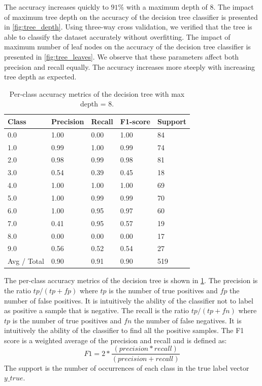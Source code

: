 The accuracy increases quickly to $91\%$ with a maximum depth of $8$. The impact
of maximum tree depth on the accuracy of the decision tree classifier
is presented in \cref{fig:tree_depth}. Using three-way cross validation,
we verified that the tree is able to classify the dataset accurately 
without overfitting. 
The impact of maximum number of leaf nodes on the accuracy of the 
decision tree classifier is presented in \cref{fig:tree_leaves}.
We observe that these parameters affect both precision and recall
equally. The accuracy increases more steeply with increasing tree
depth as expected.

\begin{table}[h!]
  \centering
  \begin{tabular}{l|llll} 
	\toprule
   		Class &  Precision  &  Recall &  F1-score  &  Support  \\    
    \midrule
		0.0   &    1.00   &   0.00   &   1.00   &     84   \\
        1.0   &    0.99   &   1.00   &   0.99   &     74   \\
        2.0   &    0.98   &   0.99   &   0.98   &     81   \\
        3.0   &    0.54   &   0.39   &   0.45   &     18   \\
        4.0   &    1.00   &   1.00   &   1.00   &     69   \\
        5.0   &    1.00   &   0.99   &   0.99   &     70   \\
        6.0   &    1.00   &   0.95   &   0.97   &     60   \\
        7.0   &    0.41   &   0.95   &   0.57   &     19   \\
        8.0   &    0.00   &   0.00   &   0.00   &     17   \\
        9.0   &    0.56   &   0.52   &   0.54   &     27   \\
    \midrule
Avg / Total   &    0.90   &   0.91   &   0.90   &    519   \\
   \bottomrule
   \end{tabular}
\caption{Per-class accuracy metrics of the decision tree with max depth = 8.}
\label{tab:dt_stats}
\end{table}

The per-class accuracy metrics of the decision tree is shown in 
\cref{tab:dt_stats}.
The precision is the ratio $tp/(tp+fp)$ where $tp$ is the number of true
positives and $fp$ the number of false positives. 
It is intuitively the ability of the classifier not to label 
as positive a sample that is negative.
The recall is the ratio $tp/(tp+fn)$ where $tp$ is the number of true
positives and $fn$ the number of false negatives. It is intuitively the
ability of the classifier to find all the positive samples.
The F1 score is a weighted average of the precision and recall 
and is defined as:
$$F1 = 2 * \frac{(precision * recall)}{(precision + recall)}$$
The support is the number of occurrences of each class in the true label
vector $y\_true$.

